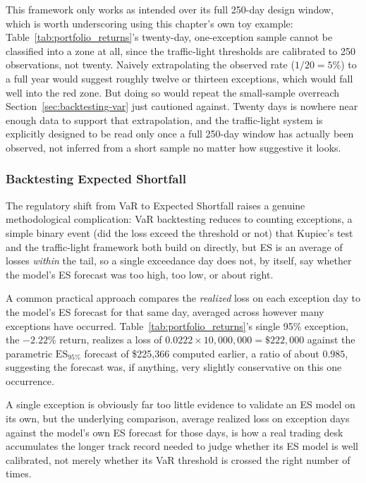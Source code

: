 \documentclass[../ai_in_finance]{subfiles}
\begin{document}
This framework only works as intended over its full 250-day design window, which is worth underscoring using this chapter's own toy example: Table~\ref{tab:portfolio_returns}'s twenty-day, one-exception sample cannot be classified into a zone at all, since the traffic-light thresholds are calibrated to 250 observations, not twenty.
Naively extrapolating the observed rate ($1/20=5\%$) to a full year would suggest roughly twelve or thirteen exceptions, which would fall well into the red zone. But doing so would repeat the small-sample overreach Section~\ref{sec:backtesting-var} just cautioned against. Twenty days is nowhere near enough data to support that extrapolation, and the traffic-light system is explicitly designed to be read only once a full 250-day window has actually been observed, not inferred from a short sample no matter how suggestive it looks.

\subsubsection*{Backtesting Expected Shortfall}

The regulatory shift from VaR to Expected Shortfall raises a genuine methodological complication: VaR backtesting reduces to counting exceptions, a simple binary event (did the loss exceed the threshold or not) that Kupiec's test and the traffic-light framework both build on directly, but ES is an average of losses \emph{within} the tail, so a single exceedance day does not, by itself, say whether the model's ES forecast was too high, too low, or about right.

A common practical approach compares the \emph{realized} loss on each exception day to the model's ES forecast for that same day, averaged across however many exceptions have occurred. Table~\ref{tab:portfolio_returns}'s single 95\% exception, the $-2.22\%$ return, realizes a loss of $0.0222 \times 10{,}000{,}000 = \$222{,}000$ against the parametric $\text{ES}_{95\%}$ forecast of \$225,366 computed earlier, a ratio of about $0.985$, suggesting the forecast was, if anything, very slightly conservative on this one occurrence.

A single exception is obviously far too little evidence to validate an ES model on its own, but the underlying comparison, average realized loss on exception days against the model's own ES forecast for those days, is how a real trading desk accumulates the longer track record needed to judge whether its ES model is well calibrated, not merely whether its VaR threshold is crossed the right number of times.
\end{document}
